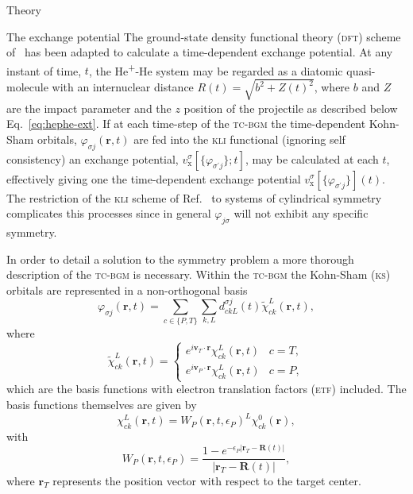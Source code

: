 \documentclass[aps, pra, reprint, groupedaddress, amsfonts, longbibliography,
               amsmath, amssymb, showpacs, nofootinbib]{revtex4-1}
\begin{document}
\begin{section}{Theory \label{sec:theory}}
\begin{subsection}{The exchange potential \label{sec:xpot}}
      The ground-state density functional theory (\textsc{dft}) scheme of~\cite{diamol} has been adapted
      to calculate a time-dependent exchange potential. At any instant of time, $t$, the
      He\textsuperscript{+}-He system may be regarded as a diatomic quasi-molecule with an internuclear
      distance $R(t) = \sqrt{b^2 + Z(t)^2}$, where $b$ and $Z$ are the impact parameter and the $z$
      position of the projectile as described below Eq.~\eqref{eq:hephe-ext}. If at each
      time-step of the \textsc{tc-bgm} the time-dependent Kohn-Sham orbitals,
      $\varphi_{\sigma j}(\mathbf{r},t)$ are fed into the \textsc{kli} functional (ignoring self
      consistency) an exchange potential, $v^{\sigma}_\mathrm{x}[ \{ \varphi_{\sigma^\prime j} \};t]$,
      may be calculated at each $t$, effectively giving one the time-dependent exchange potential
      $v^{\sigma}_\mathrm{x}[ \{ \varphi_{\sigma^\prime j} \}](t)$. The restriction of the \textsc{kli}
      scheme of Ref.~\cite{diamol} to systems of cylindrical symmetry complicates this processes since in
      general $\varphi_{j \sigma}$ will not exhibit any specific symmetry.
      
      In order to detail a solution to the symmetry problem a more thorough description of the
      \textsc{tc-bgm} is necessary. Within the \textsc{tc-bgm} the Kohn-Sham (\textsc{ks}) orbitals are
      represented in a non-orthogonal basis
      \begin{equation} \label{eq:bgmexp}
         \varphi_{\sigma j}(\mathbf{r},t) = \sum\limits_{c \in \{P, T\}} \sum\limits_{k, L}
                               d_{c k L}^{\sigma j}(t) \tilde{\chi}^{L}_{c k}(\mathbf{r},t),
      \end{equation}
      where
      \begin{equation} \label{eq:etfbasis}
         \tilde{\chi}^{L}_{ck}(\mathbf{r},t) =
            \begin{cases}
               e^{i \mathbf{v}_T \cdot \mathbf{r}} {\chi}^{L}_{c k}(\mathbf{r},t) & c = T, \\[2ex]
               e^{i \mathbf{v}_P \cdot \mathbf{r}} {\chi}^{L}_{c k}(\mathbf{r},t) & c = P,
            \end{cases}
      \end{equation}
      which are the basis functions with electron translation factors (\textsc{etf}) included. The basis
      functions themselves are given by
      \begin{equation} \label{eq:bgmbasis}
         \chi^{L}_{ck} (\mathbf{r},t)
         = W_P( \mathbf{r},t, \epsilon_P)^L \chi^{0}_{ck} (\mathbf{r}),
      \end{equation}
      with
      \begin{equation}
         W_P (\mathbf{r},t,\epsilon_P)
         = \frac{1 - e^{-\epsilon_P|\mathbf{r}_T - \mathbf{R}(t)|}}{|\mathbf{r}_T - \mathbf{R}(t)|},
      \end{equation}
      where $\mathbf{r}_T$ represents the position vector with respect to the target center.
      

\end{subsection}
\end{section}
\end{document}

